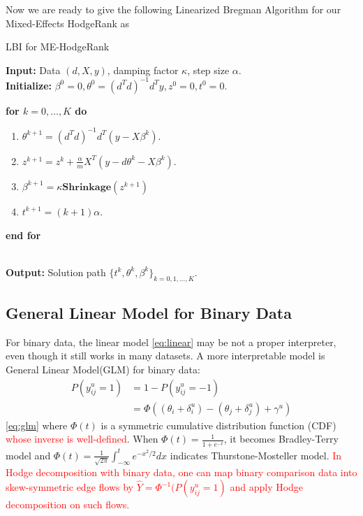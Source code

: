 \documentclass[10pt,journal,cspaper,compsoc]{IEEEtran}
\begin{document}
{Now we are ready to give the following Linearized Bregman Algorithm for our Mixed-Effects HodgeRank as
\begin{algorithm}
\caption{LBI for ME-HodgeRank}\label{alg-LBI-LME}
\textbf{Input:} Data $(d,X,y)$, damping factor $\kappa$, step size $\alpha$.\\
\textbf{Initialize:} $\beta^0 = 0,\theta^0 = (d^Td)^{-1}d^Ty,z^0=0,t^0=0$.\\
{\textbf{for $k=0,\dots,K$ do}
\begin{enumerate}
\item $\theta^{k+1} = (d^Td)^{-1}d^T(y - X\beta^k)$. \label{alg2-step1}
\item $z^{k+1}  =z^{k} + \frac{\alpha}{m} X^T(y - d\theta^k - X\beta^k)$.\label{alg2-step2}
\item $\beta^{k+1} = \kappa\mathbf{Shrinkage}(z^{k+1})$
\item $t^{k+1} = (k+1)\alpha$.
\end{enumerate}
\textbf{end for}}\\
\textbf{Output:} Solution path $\{t^k, \theta^k,\beta^k\}_{k= 0,1,\dots,K}$.
\end{algorithm}

\subsection{General Linear Model for Binary Data} \label{sec:glm}
For binary data, the linear model \eqref{eq:linear} may be not a proper interpreter, even though it still works in many datasets. A more interpretable model is General Linear Model(GLM) for binary data:
\begin{align}\label{eq:glm}
P(y^u_{ij} = 1) &= 1-P(y^u_{ij}=-1) \nonumber\\
&= \Phi((\theta_i+\delta_i^u) - (\theta_j+\delta_j^u) + \gamma^u)
\end{align}
\eqref{eq:glm} where $\Phi(t)$ is a symmetric cumulative distribution function (CDF) \textcolor{red}{whose inverse is well-defined}. When $\Phi(t) = \frac{1}{1+e^{-t}}$, it becomes Bradley-Terry model and $\Phi(t) = \frac{1}{\sqrt{2\pi}}\int_{-\infty}^{t}e^{-x^2/2}dx$ indicates Thurstone-Mosteller model. \textcolor{red}{In Hodge decomposition \cite{Hodge} with binary data, one can map binary comparison data into skew-symmetric edge flows by $\hat{Y}=\Phi^{-1}(P(y^u_{ij}=1)$ and apply Hodge decomposition on such flows.}

}
\end{document}
